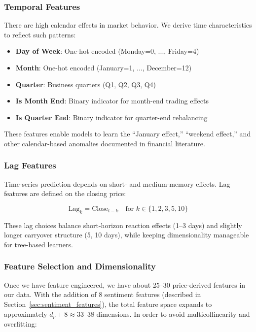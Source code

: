 \subsubsection{Temporal Features}

There are high calendar effects in market behavior. We derive time characteristics to reflect such patterns:

\begin{itemize}
    \item \textbf{Day of Week}: One-hot encoded (Monday=0, ..., Friday=4)
    \item \textbf{Month}: One-hot encoded (January=1, ..., December=12)
    \item \textbf{Quarter}: Business quarters (Q1, Q2, Q3, Q4)
    \item \textbf{Is Month End}: Binary indicator for month-end trading effects
    \item \textbf{Is Quarter End}: Binary indicator for quarter-end rebalancing
\end{itemize}

These features enable models to learn the ``January effect,'' ``weekend effect,'' and other calendar-based anomalies documented in financial literature.

\subsubsection{Lag Features}

Time-series prediction depends on short- and medium-memory effects. Lag features are defined on the closing price:

\begin{equation}
\text{Lag}_k = \text{Close}_{t-k} \quad \text{for } k \in \{1, 2, 3, 5, 10\}
\end{equation}

These lag choices balance short-horizon reaction effects (1--3 days) and slightly longer carryover structure (5, 10 days), while keeping dimensionality manageable for tree-based learners.

\subsubsection{Feature Selection and Dimensionality}

Once we have feature engineered, we have about 25--30 price-derived features in our data. With the addition of 8 sentiment features (described in Section~\ref{sec:sentiment_features}), the total feature space expands to approximately $d_p + 8 \approx 33$--$38$ dimensions. In order to avoid multicollinearity and overfitting:

